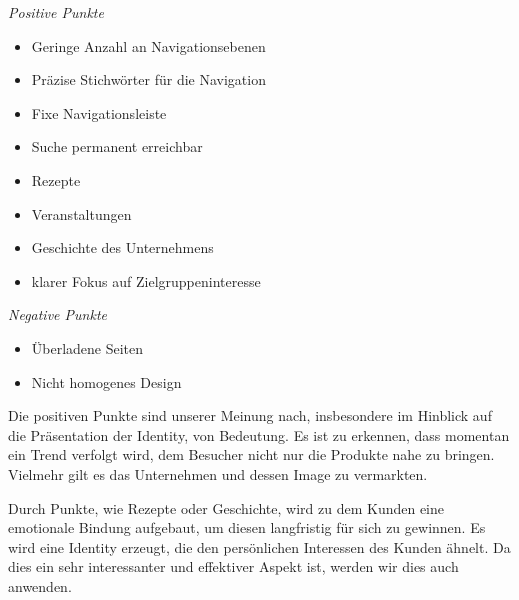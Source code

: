 \documentclass[12pt,a4paper,oneside,ngerman]{article}
\begin{document}
\emph{Positive Punkte}
\begin{itemize} %
	\item{Geringe Anzahl an Navigationsebenen}
	\item{Präzise Stichwörter für die Navigation}
	\item{Fixe Navigationsleiste}
	\item{Suche permanent erreichbar}
	\item{Rezepte}
	\item{Veranstaltungen}
	\item{Geschichte des Unternehmens}
	\item{klarer Fokus auf Zielgruppeninteresse}
\end{itemize}

\emph{Negative Punkte}
\begin{itemize} %
	\item{Überladene Seiten}
	\item{Nicht homogenes Design}
\end{itemize}

Die positiven Punkte sind unserer Meinung nach, insbesondere im Hinblick auf die Präsentation der Identity, von Bedeutung. Es ist zu erkennen, dass momentan ein Trend verfolgt wird, dem Besucher nicht nur die Produkte nahe zu bringen. Vielmehr gilt es das Unternehmen und dessen Image zu vermarkten. 

Durch Punkte, wie Rezepte oder Geschichte, wird zu dem Kunden eine emotionale Bindung aufgebaut, um diesen langfristig für sich zu gewinnen. 
Es wird eine Identity erzeugt, die den persönlichen Interessen des Kunden ähnelt.
Da dies ein sehr interessanter und effektiver Aspekt ist, werden wir dies auch anwenden.
\end{document}
